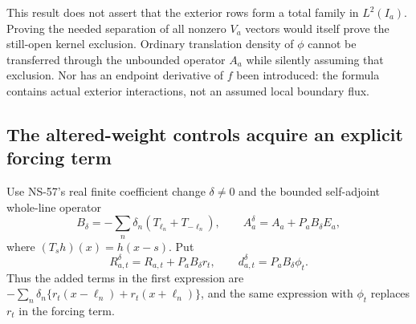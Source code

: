 This result does not assert that the exterior rows form a total family
in $L^2(I_a)$. Proving the needed separation of all nonzero $V_a$
vectors would itself prove the still-open kernel exclusion. Ordinary
translation density of $\phi$ cannot be transferred through the
unbounded operator $A_a$ while silently assuming that exclusion.
Nor has an endpoint derivative of $f$ been introduced: the formula
contains actual exterior interactions, not an assumed local boundary flux.

\subsection*{The altered-weight controls acquire an explicit forcing term}

Use NS-57's real finite coefficient change $\delta\ne0$ and the
bounded self-adjoint whole-line operator
\[
 B_\delta=-\sum_n\delta_n(T_{\ell_n}+T_{-\ell_n}),\qquad
 A_a^\delta=A_a+P_a B_\delta E_a,
\]
where $(T_s h)(x)=h(x-s)$. Put
\[
 R_{a,t}^\delta=R_{a,t}+P_aB_\delta r_t,
 \qquad d_{a,t}^\delta=P_aB_\delta\phi_t.
\]
Thus the added terms in the first expression are
$-\sum_n\delta_n\{r_t(x-\ell_n)+r_t(x+\ell_n)\}$, and the
same expression with $\phi_t$ replaces $r_t$ in the forcing term.

